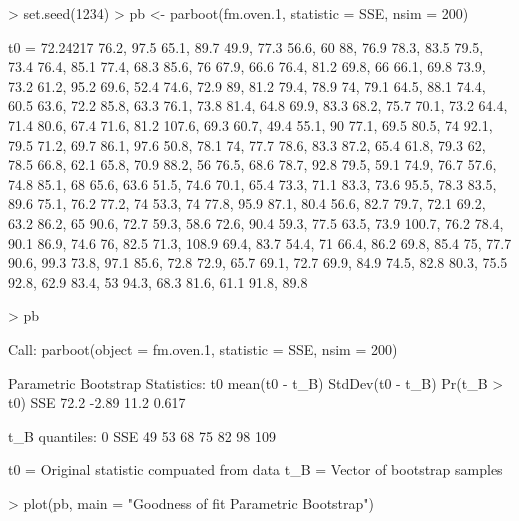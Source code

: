 \documentclass[article,shortnames]{jss}
\begin{document}
\begin{Schunk}
\begin{Sinput}
> set.seed(1234)
> pb <- parboot(fm.oven.1, statistic = SSE, nsim = 200)
\end{Sinput}
\begin{Soutput}
t0 = 72.24217 
76.2, 97.5
65.1, 89.7
49.9, 77.3
56.6, 60
88, 76.9
78.3, 83.5
79.5, 73.4
76.4, 85.1
77.4, 68.3
85.6, 76
67.9, 66.6
76.4, 81.2
69.8, 66
66.1, 69.8
73.9, 73.2
61.2, 95.2
69.6, 52.4
74.6, 72.9
89, 81.2
79.4, 78.9
74, 79.1
64.5, 88.1
74.4, 60.5
63.6, 72.2
85.8, 63.3
76.1, 73.8
81.4, 64.8
69.9, 83.3
68.2, 75.7
70.1, 73.2
64.4, 71.4
80.6, 67.4
71.6, 81.2
107.6, 69.3
60.7, 49.4
55.1, 90
77.1, 69.5
80.5, 74
92.1, 79.5
71.2, 69.7
86.1, 97.6
50.8, 78.1
74, 77.7
78.6, 83.3
87.2, 65.4
61.8, 79.3
62, 78.5
66.8, 62.1
65.8, 70.9
88.2, 56
76.5, 68.6
78.7, 92.8
79.5, 59.1
74.9, 76.7
57.6, 74.8
85.1, 68
65.6, 63.6
51.5, 74.6
70.1, 65.4
73.3, 71.1
83.3, 73.6
95.5, 78.3
83.5, 89.6
75.1, 76.2
77.2, 74
53.3, 74
77.8, 95.9
87.1, 80.4
56.6, 82.7
79.7, 72.1
69.2, 63.2
86.2, 65
90.6, 72.7
59.3, 58.6
72.6, 90.4
59.3, 77.5
63.5, 73.9
100.7, 76.2
78.4, 90.1
86.9, 74.6
76, 82.5
71.3, 108.9
69.4, 83.7
54.4, 71
66.4, 86.2
69.8, 85.4
75, 77.7
90.6, 99.3
73.8, 97.1
85.6, 72.8
72.9, 65.7
69.1, 72.7
69.9, 84.9
74.5, 82.8
80.3, 75.5
92.8, 62.9
83.4, 53
94.3, 68.3
81.6, 61.1
91.8, 89.8
\end{Soutput}
\end{Schunk}
\begin{Schunk}
\begin{Sinput}
> pb
\end{Sinput}
\begin{Soutput}
Call: parboot(object = fm.oven.1, statistic = SSE, nsim = 200)

Parametric Bootstrap Statistics:
      t0 mean(t0 - t_B) StdDev(t0 - t_B) Pr(t_B > t0)
SSE 72.2          -2.89             11.2        0.617

t_B quantiles:
    0% 2.5% 25% 50% 75% 97.5% 100%
SSE 49   53  68  75  82    98  109

t0 = Original statistic compuated from data
t_B = Vector of bootstrap samples
\end{Soutput}
\end{Schunk}

\begin{Schunk}
\begin{Sinput}
> plot(pb, main = "Goodness of fit Parametric Bootstrap")
\end{Sinput}
\end{Schunk}
\end{document}
